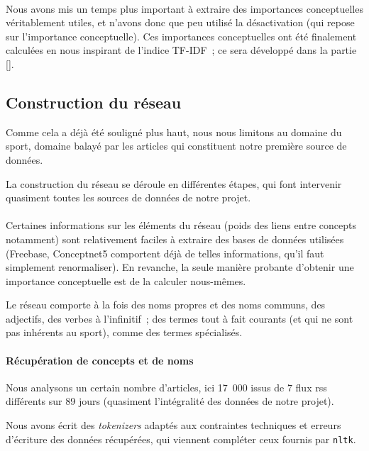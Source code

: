 \documentclass[a4paper, 12pt]{article}
\newcommand{\pyt}[1]{\texttt{#1}}%
\newcommand{\ang}[1]{\textit{#1}}%
\begin{document}
\paragraph{}
Nous avons mis un temps plus important à extraire des importances conceptuelles véritablement utiles, et n'avons donc que peu utilisé la désactivation (qui repose sur l'importance conceptuelle). Ces importances conceptuelles ont été finalement calculées en nous inspirant de l'indice TF-IDF~; ce sera développé dans la partie [].



\subsection{Construction du réseau}
Comme cela a déjà été souligné plus haut, nous nous limitons au domaine du sport, domaine balayé par les articles qui constituent notre première source de données. 

La construction du réseau se déroule en différentes étapes, qui font intervenir quasiment toutes les sources de données de notre projet.


\paragraph{}
Certaines informations sur les éléments du réseau (poids des liens entre concepts notamment) sont relativement faciles à extraire des bases de données utilisées (Freebase, Conceptnet5 comportent déjà de telles informations, qu'il faut simplement renormaliser). En revanche, la seule manière probante d'obtenir une importance conceptuelle est de la calculer nous-mêmes.

Le réseau comporte à la fois des noms propres et des noms communs, des adjectifs, des verbes à l'infinitif~; des termes tout à fait courants (et qui ne sont pas inhérents au sport), comme des termes spécialisés.



\paragraph{Récupération de concepts et de noms}

Nous analysons un certain nombre d'articles, ici 17~000 issus de 7 flux rss différents sur 89 jours (quasiment l'intégralité des données de notre projet).


Nous avons écrit des \ang{tokenizers} adaptés aux contraintes techniques et erreurs d'écriture des données récupérées, qui viennent compléter ceux fournis par \pyt{nltk}.
\end{document}
